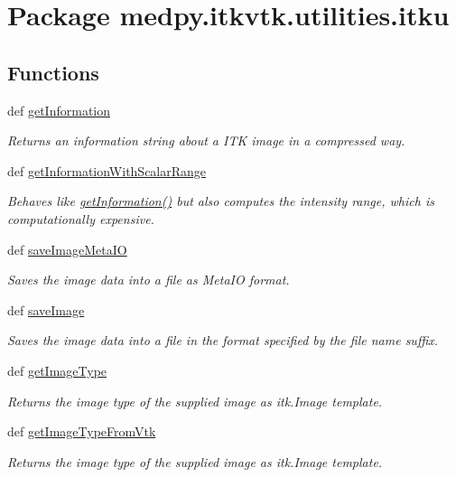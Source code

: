 \hypertarget{namespacemedpy_1_1itkvtk_1_1utilities_1_1itku}{
\section{Package medpy.itkvtk.utilities.itku}
\label{namespacemedpy_1_1itkvtk_1_1utilities_1_1itku}
}
\subsection*{Functions}
\begin{DoxyCompactItemize}
\item 
def \hyperlink{namespacemedpy_1_1itkvtk_1_1utilities_1_1itku_a3798a24614a8e9e351d1005bf9ec52eb}{getInformation}
\begin{DoxyCompactList}\small\item\em Returns an information string about a ITK image in a compressed way. \end{DoxyCompactList}\item 
def \hyperlink{namespacemedpy_1_1itkvtk_1_1utilities_1_1itku_a397166c14ec92ee6ae6a7ab06f562b4d}{getInformationWithScalarRange}
\begin{DoxyCompactList}\small\item\em Behaves like \hyperlink{namespacemedpy_1_1itkvtk_1_1utilities_1_1itku_a3798a24614a8e9e351d1005bf9ec52eb}{getInformation()} but also computes the intensity range, which is computationally expensive. \end{DoxyCompactList}\item 
def \hyperlink{namespacemedpy_1_1itkvtk_1_1utilities_1_1itku_aa29596218c0ae9604c631f417878fb40}{saveImageMetaIO}
\begin{DoxyCompactList}\small\item\em Saves the image data into a file as MetaIO format. \end{DoxyCompactList}\item 
def \hyperlink{namespacemedpy_1_1itkvtk_1_1utilities_1_1itku_a2af07a5c8be156c7076e2a148b31644c}{saveImage}
\begin{DoxyCompactList}\small\item\em Saves the image data into a file in the format specified by the file name suffix. \end{DoxyCompactList}\item 
def \hyperlink{namespacemedpy_1_1itkvtk_1_1utilities_1_1itku_ae402f54ef990904f14b1b699609898fe}{getImageType}
\begin{DoxyCompactList}\small\item\em Returns the image type of the supplied image as itk.Image template. \end{DoxyCompactList}\item 
def \hyperlink{namespacemedpy_1_1itkvtk_1_1utilities_1_1itku_a20691b25dc99892aaed5f6d6d59063c4}{getImageTypeFromVtk}
\begin{DoxyCompactList}\small\item\em Returns the image type of the supplied image as itk.Image template. \end{DoxyCompactList}\end{DoxyCompactItemize}
